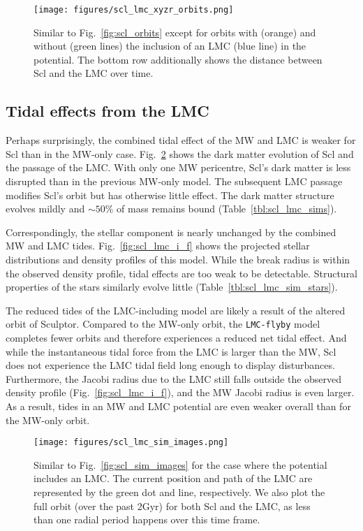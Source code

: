 \begin{figure}
\centering
\texttt{[image: figures/scl\_lmc\_xyzr\_orbits.png]}
\caption[Sculptor orbits with LMC]{Similar to Fig.~\ref{fig:scl_orbits}
except for orbits with (orange) and without (green lines) the inclusion
of an LMC (blue line) in the potential. The bottom row additionally
shows the distance between Scl and the LMC over
time.}\label{fig:scl_lmc_orbits_effect}
\end{figure}

\subsection{Tidal effects from the
LMC}\label{tidal-effects-from-the-lmc}

Perhaps surprisingly, the combined tidal effect of the MW and LMC is
weaker for Scl than in the MW-only case.
Fig.~\ref{fig:scl_lmc_sim_images} shows the dark matter evolution of Scl
and the passage of the LMC. With only one MW pericentre, Scl's dark
matter is less disrupted than in the previous MW-only model. The
subsequent LMC passage modifies Scl's orbit but has otherwise little
effect. The dark matter structure evolves mildly and \(\sim 50\%\) of
mass remains bound (Table~\ref{tbl:scl_lmc_sims}).

Correspondingly, the stellar component is nearly unchanged by the
combined MW and LMC tides. Fig.~\ref{fig:scl_lmc_i_f} shows the
projected stellar distributions and density profiles of this model.
While the break radius is within the observed density profile, tidal
effects are too weak to be detectable. Structural properties of the
stars similarly evolve little (Table~\ref{tbl:scl_lmc_sim_stars}).

The reduced tides of the LMC-including model are likely a result of the
altered orbit of Sculptor. Compared to the MW-only \smallperi{} orbit,
the \texttt{LMC-flyby} model completes fewer orbits and therefore
experiences a reduced net tidal effect. And while the instantaneous
tidal force from the LMC is larger than the MW, Scl does not experience
the LMC tidal field long enough to display disturbances. Furthermore,
the Jacobi radius due to the LMC still falls outside the observed
density profile (Fig.~\ref{fig:scl_lmc_i_f}), and the MW Jacobi radius
is even larger. As a result, tides in an MW and LMC potential are even
weaker overall than for the MW-only orbit.

\begin{figure}
\centering
\texttt{[image: figures/scl\_lmc\_sim\_images.png]}
\caption[Sculptor simulation snapshots with LMC]{Similar to
Fig.~\ref{fig:scl_sim_images} for the case where the potential includes
an LMC. The current position and path of the LMC are represented by the
green dot and line, respectively. We also plot the full orbit (over the
past 2Gyr) for both Scl and the LMC, as less than one radial period
happens over this time frame.}\label{fig:scl_lmc_sim_images}
\end{figure}

